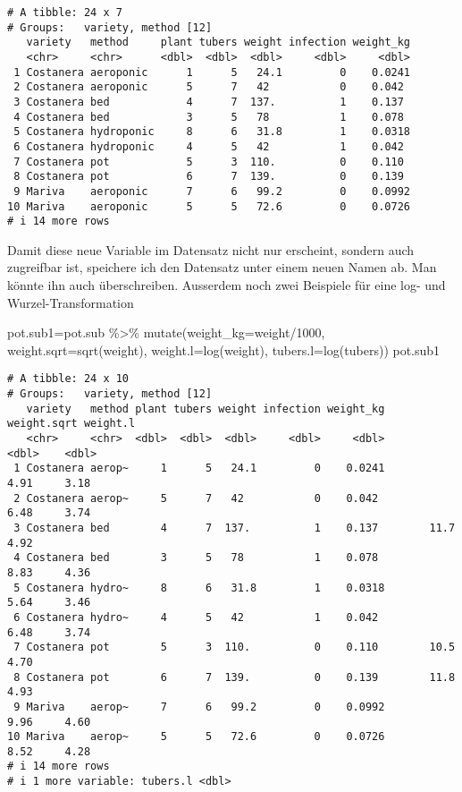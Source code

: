 \documentclass[
  letterpaper,
  DIV=11,
  numbers=noendperiod]{scrartcl}
\newenvironment{Shaded}{\begin{snugshade}}{\end{snugshade}}
\newcommand{\AttributeTok}[1]{\textcolor[rgb]{0.40,0.45,0.13}{#1}}
\newcommand{\DecValTok}[1]{\textcolor[rgb]{0.68,0.00,0.00}{#1}}
\newcommand{\FunctionTok}[1]{\textcolor[rgb]{0.28,0.35,0.67}{#1}}
\newcommand{\NormalTok}[1]{\textcolor[rgb]{0.00,0.23,0.31}{#1}}
\newcommand{\OtherTok}[1]{\textcolor[rgb]{0.00,0.23,0.31}{#1}}
\newcommand{\SpecialCharTok}[1]{\textcolor[rgb]{0.37,0.37,0.37}{#1}}
\begin{document}
\begin{verbatim}
# A tibble: 24 x 7
# Groups:   variety, method [12]
   variety   method     plant tubers weight infection weight_kg
   <chr>     <chr>      <dbl>  <dbl>  <dbl>     <dbl>     <dbl>
 1 Costanera aeroponic      1      5   24.1         0    0.0241
 2 Costanera aeroponic      5      7   42           0    0.042 
 3 Costanera bed            4      7  137.          1    0.137 
 4 Costanera bed            3      5   78           1    0.078 
 5 Costanera hydroponic     8      6   31.8         1    0.0318
 6 Costanera hydroponic     4      5   42           1    0.042 
 7 Costanera pot            5      3  110.          0    0.110 
 8 Costanera pot            6      7  139.          0    0.139 
 9 Mariva    aeroponic      7      6   99.2         0    0.0992
10 Mariva    aeroponic      5      5   72.6         0    0.0726
# i 14 more rows
\end{verbatim}

Damit diese neue Variable im Datensatz nicht nur erscheint, sondern auch
zugreifbar ist, speichere ich den Datensatz unter einem neuen Namen ab.
Man könnte ihn auch überschreiben. Ausserdem noch zwei Beispiele für
eine log- und Wurzel-Transformation

\begin{Shaded}
\begin{Highlighting}[]
\NormalTok{pot.sub1}\OtherTok{=}\NormalTok{pot.sub }\SpecialCharTok{\%\textgreater{}\%} 
  \FunctionTok{mutate}\NormalTok{(}\AttributeTok{weight\_kg=}\NormalTok{weight}\SpecialCharTok{/}\DecValTok{1000}\NormalTok{,}
         \AttributeTok{weight.sqrt=}\FunctionTok{sqrt}\NormalTok{(weight),}
         \AttributeTok{weight.l=}\FunctionTok{log}\NormalTok{(weight),}
         \AttributeTok{tubers.l=}\FunctionTok{log}\NormalTok{(tubers))}
\NormalTok{pot.sub1}
\end{Highlighting}
\end{Shaded}

\begin{verbatim}
# A tibble: 24 x 10
# Groups:   variety, method [12]
   variety   method plant tubers weight infection weight_kg weight.sqrt weight.l
   <chr>     <chr>  <dbl>  <dbl>  <dbl>     <dbl>     <dbl>       <dbl>    <dbl>
 1 Costanera aerop~     1      5   24.1         0    0.0241        4.91     3.18
 2 Costanera aerop~     5      7   42           0    0.042         6.48     3.74
 3 Costanera bed        4      7  137.          1    0.137        11.7      4.92
 4 Costanera bed        3      5   78           1    0.078         8.83     4.36
 5 Costanera hydro~     8      6   31.8         1    0.0318        5.64     3.46
 6 Costanera hydro~     4      5   42           1    0.042         6.48     3.74
 7 Costanera pot        5      3  110.          0    0.110        10.5      4.70
 8 Costanera pot        6      7  139.          0    0.139        11.8      4.93
 9 Mariva    aerop~     7      6   99.2         0    0.0992        9.96     4.60
10 Mariva    aerop~     5      5   72.6         0    0.0726        8.52     4.28
# i 14 more rows
# i 1 more variable: tubers.l <dbl>
\end{verbatim}
\end{document}
